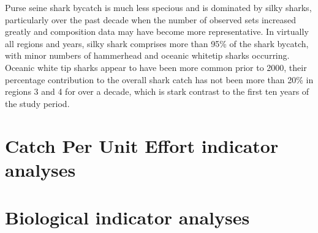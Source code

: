 \documentclass[12pt]{SCreport}
\begin{document}
Purse seine shark bycatch is much less specious and is dominated by silky sharks, particularly over the past decade when the number of observed sets increased greatly and composition data may have become more representative.  In virtually all regions and years, silky shark comprises more than 95\% of the shark bycatch, with minor numbers of hammerhead and oceanic whitetip sharks occurring.  Oceanic white tip sharks appear to have been more common prior to 2000, their percentage contribution to the overall shark catch has not been more than 20\% in regions 3 and 4 for over a decade, which is stark contrast to the first ten years of the study period. 

 \clearpage          

\section{Catch Per Unit Effort indicator analyses}




\clearpage
      
\section{Biological indicator analyses}
\end{document}
